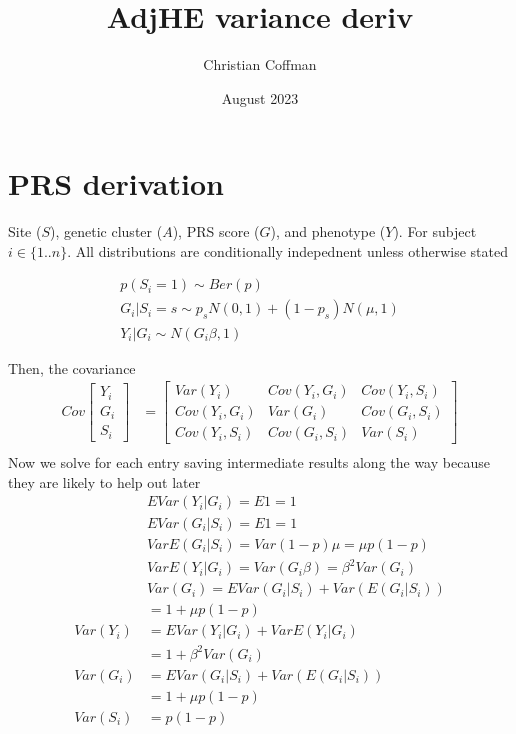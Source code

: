 \documentclass{article}
\title{AdjHE variance deriv}
\author{Christian Coffman}
\date{August 2023}
\begin{document}
\section{PRS derivation}
Site ($S$), genetic cluster ($A$), PRS score ($G$), and phenotype ($Y$). For subject $i \in \{1..n\}$. All distributions are conditionally indepednent unless otherwise stated

\begin{align*}
    p(S_i = 1) \sim Ber(p) \\
    G_i | S_i = s \sim p_sN(0, 1) + (1-p_s)N(\mu, 1) \\
    Y_i | G_i \sim N(G_i\beta, 1)
\end{align*}

Then, the covariance 
\begin{align*}
    Cov \begin{bmatrix}
        Y_i \\ G_i\\ S_i 
    \end{bmatrix} & = 
    \begin{bmatrix}
        Var(Y_i) & Cov(Y_i, G_i) & Cov(Y_i, S_i) \\
        Cov(Y_i, G_i) & Var(G_i) & Cov(G_i, S_i) \\
        Cov(Y_i, S_i) & Cov(G_i, S_i) & Var(S_i)
    \end{bmatrix} \\
\end{align*}
Now we solve for each entry saving intermediate results along the way because they are likely to help out later 
\begin{align*}
    & EVar(Y_i|G_i) = E1 = 1 \\
    & EVar(G_i|S_i) = E1 = 1 \\
    & VarE(G_i|S_i) = Var(1-p)\mu = \mu p(1-p) \\
    & VarE(Y_i|G_i) = Var(G_i\beta)  =\beta^2Var(G_i) \\
    & Var(G_i) = EVar(G_i|S_i) + Var(E(G_i|S_i)) \\
    & = 1 + \mu p(1-p) \\ 
    Var(Y_i) & = EVar(Y_i|G_i) + VarE(Y_i|G_i)\\
     & = 1 + \beta^2 Var(G_i) \\
    Var(G_i) & = EVar(G_i|S_i) + Var(E(G_i|S_i)) \\ 
             & = 1 + \mu p(1-p) \\
    Var(S_i) & = p(1-p) \\
\end{align*}
\end{document}
